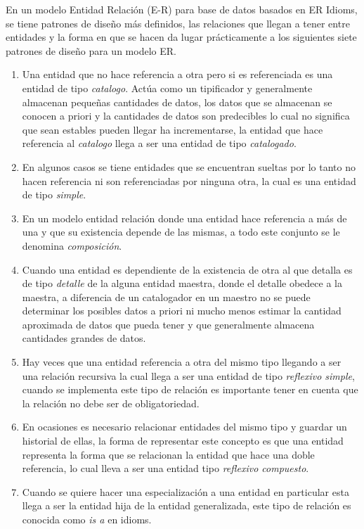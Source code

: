 En un modelo Entidad Relaci\'on (E-R) para base de datos basados en ER Idioms\cite{idioms}, se tiene patrones de dise\~no m\'as definidos, las relaciones que llegan a tener entre entidades y la forma en que se hacen da lugar pr\'acticamente a los siguientes siete patrones de dise\~no para un modelo ER.
\begin{enumerate}
\item Una entidad que no hace referencia a otra pero si es referenciada es una entidad de tipo \textit{catalogo}. Act\'ua como un tipificador y generalmente almacenan peque\~nas cantidades de datos, los datos que se almacenan  se conocen a priori y la cantidades de datos son predecibles lo cual no significa que sean estables pueden llegar ha incrementarse, la entidad que hace referencia al \textit{catalogo} llega a ser una entidad de tipo \textit{catalogado}.
\item En algunos casos se tiene entidades que se encuentran sueltas por lo tanto no hacen referencia ni son referenciadas por ninguna otra, la cual es una entidad de tipo \textit{simple}.
\item En un modelo entidad relaci\'on donde una entidad hace referencia a m\'as de una y que su existencia depende de las mismas, a todo este conjunto se le denomina  \textit{composici\'on}.
\item
Cuando una entidad es dependiente de la existencia de otra al que detalla es de tipo \textit{detalle} de la alguna entidad maestra, donde el  detalle obedece a la maestra, a diferencia de un catalogador en un maestro no se puede determinar  los posibles datos a priori ni mucho menos estimar la cantidad aproximada de datos que pueda tener y que generalmente almacena cantidades grandes de datos.
\item
Hay veces que una entidad referencia a otra del mismo tipo llegando a ser una relaci\'on recursiva la cual llega a ser una entidad de tipo \textit{reflexivo simple}, cuando se implementa este tipo de relaci\'on es importante tener en cuenta que la relaci\'on no debe ser de obligatoriedad.
\item
En ocasiones es necesario relacionar entidades del mismo tipo y guardar un historial de ellas, la forma de representar este concepto es que una entidad representa la forma que se relacionan la entidad que hace una doble referencia, lo cual lleva a ser una entidad tipo  \textit{reflexivo compuesto}.
\item
Cuando se quiere hacer una especializaci\'on a una entidad en particular esta llega a ser la entidad hija de la entidad generalizada, este tipo de relaci\'on es conocida como \textit{is a} en idioms.
\end{enumerate}

